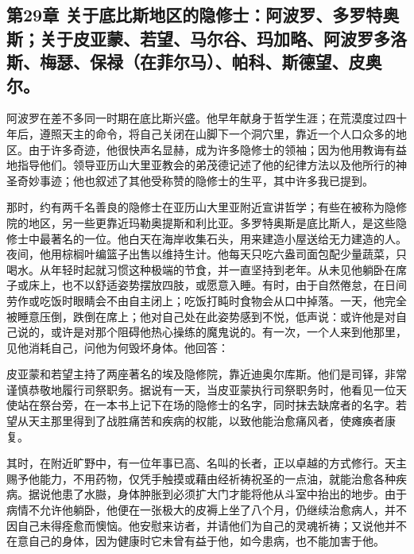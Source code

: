 
\subsection{第29章 关于底比斯地区的隐修士：阿波罗、多罗特奥斯；关于皮亚蒙、若望、马尔谷、玛加略、阿波罗多洛斯、梅瑟、保禄（在菲尔马）、帕科、斯德望、皮奥尔。}

阿波罗在差不多同一时期在底比斯兴盛。他早年献身于哲学生涯；在荒漠度过四十年后，遵照天主的命令，将自己关闭在山脚下一个洞穴里，靠近一个人口众多的地区。由于许多奇迹，他很快声名显赫，成为许多隐修士的领袖；因为他用教诲有益地指导他们。领导亚历山大里亚教会的弟茂德记述了他的纪律方法以及他所行的神圣奇妙事迹；他也叙述了其他受称赞的隐修士的生平，其中许多我已提到。\par

那时，约有两千名善良的隐修士在亚历山大里亚附近宣讲哲学；有些在被称为隐修院的地区，另一些更靠近玛勒奥提斯和利比亚。多罗特奥斯是底比斯人，是这些隐修士中最著名的一位。他白天在海岸收集石头，用来建造小屋送给无力建造的人。夜间，他用棕榈叶编篮子出售以维持生计。他每天只吃六盎司面包配少量蔬菜，只喝水。从年轻时起就习惯这种极端的节食，并一直坚持到老年。从未见他躺卧在席子或床上，也不以舒适姿势摆放四肢，或愿意入睡。有时，由于自然倦怠，在日间劳作或吃饭时眼睛会不由自主闭上；吃饭打盹时食物会从口中掉落。一天，他完全被睡意压倒，跌倒在席上；他对自己处在此姿势感到不悦，低声说：或许他是对自己说的，或许是对那个阻碍他热心操练的魔鬼说的。有一次，一个人来到他那里，见他消耗自己，问他为何毁坏身体。他回答：\par

皮亚蒙和若望主持了两座著名的埃及隐修院，靠近迪奥尔库斯。他们是司铎，非常谨慎恭敬地履行司祭职务。据说有一天，当皮亚蒙执行司祭职务时，他看见一位天使站在祭台旁，在一本书上记下在场的隐修士的名字，同时抹去缺席者的名字。若望从天主那里得到了战胜痛苦和疾病的权能，以致他能治愈痛风者，使瘫痪者康复。\par

其时，在附近旷野中，有一位年事已高、名叫的长者，正以卓越的方式修行。天主赐予他能力，不用药物，仅凭手触摸或藉由经祈祷祝圣的一点油，就能治愈各种疾病。据说他患了水臌，身体肿胀到必须扩大门才能将他从斗室中抬出的地步。由于病情不允许他躺卧，他便在一张极大的皮褥上坐了八个月，仍继续治愈病人，并不因自己未得痊愈而懊恼。他安慰来访者，并请他们为自己的灵魂祈祷；又说他并不在意自己的身体，因为健康时它未曾有益于他，如今患病，也不能加害于他。\par

